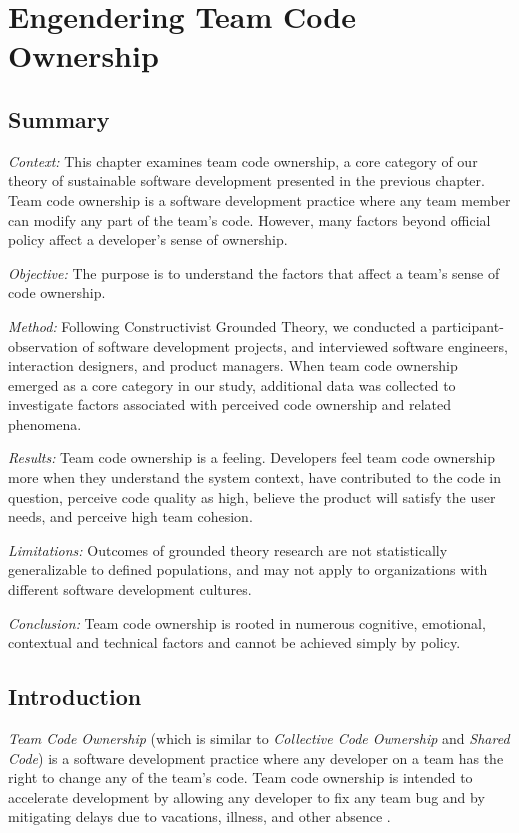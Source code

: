\chapter{Engendering Team Code Ownership}
\label{TeamCodeOwnershipChapter}


\section{Summary}


\textit{Context:} This chapter examines team code ownership, a core category of our theory of sustainable software development presented in the previous chapter. Team code ownership is a software development practice where any team member can modify any part of the team's code. However, many factors beyond official policy affect a developer's sense of ownership. 


\textit{Objective:} The purpose is to understand the factors that affect a team's sense of code ownership.


\textit{Method:} Following Constructivist Grounded Theory, we conducted a \durationOfResearchStudy{} participant-observation of \numberOfObservedProjects{} software development projects, and interviewed \numberOfInterviews{} software engineers, interaction designers, and product managers.  When team code ownership emerged as a core category in our study, additional data was collected to investigate factors associated with perceived code ownership and related phenomena.


\textit{Results:} Team code ownership is a feeling. Developers feel team code ownership more when they understand the system context, have contributed to the code in question, perceive code quality as high, believe the product will satisfy the user needs, and perceive high team cohesion.  


\textit{Limitations:} Outcomes of grounded theory research are not statistically generalizable to defined populations, and may not apply to organizations with different software development cultures.


\textit{Conclusion:} Team code ownership is rooted in numerous cognitive, emotional, contextual and technical factors and cannot be achieved simply by policy. 


\section{Introduction}
\textit{Team Code Ownership} (which is similar to \textit{Collective Code Ownership} and \textit{Shared Code}) is a software development practice where any developer on a team has the right to change any of the team's code. Team code ownership is intended to accelerate development by allowing any developer to fix any team bug and by mitigating delays due to vacations, illness, and other absence \cite{BeckExtremeProgramming2004}.
 
